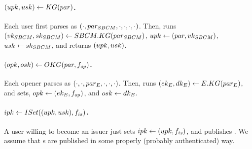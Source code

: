 \paragraph{$(upk,usk) \gets KG(par)$.} %
Each user first parses \parm as $(\cdot,par_{SBCM},\cdot,\cdot,\cdot,\cdot)$.
Then, runs $(vk_{SBCM},sk_{SBCM}) \gets SBCM.KG(par_{SBCM})$, $upk \gets (par,
vk_{SBCM})$, $usk \gets sk_{SBCM}$, and returns $(upk,usk)$.

\paragraph{$(opk,osk) \gets OKG(par,f_{op})$.} %
Each opener parses \parm as $(\cdot,\cdot,par_{E},\cdot,\cdot,\cdot)$.
Then, runs $(ek_{E},dk_{E}) \gets E.KG(par_{E})$, and sets, $opk \gets (ek_{E},
f_{op})$, and $osk \gets dk_{E}$.

\paragraph{$ipk \gets ISet((upk,usk),f_{is})$.} %
A user willing to become an issuer just sets $ipk \gets (upk,f_{is})$, and
publishes \ipk. We assume that {\ipk}s are published in some properly (probably
authenticated) way.

